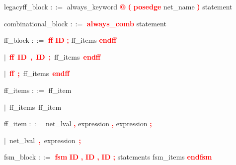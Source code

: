 \vspace{1em}
\noindent
\settowidth{\parindent}{\hspace{4ex}}
legacyff\_block $::=$\hspace{1ex} always\_keyword \textbf{\textcolor{red}{@}} \textbf{\textcolor{red}{(}} \textbf{\textcolor{red}{posedge}} net\_name \textbf{\textcolor{red}{)}} statement

\vspace{1em}
\noindent
\settowidth{\parindent}{\hspace{4ex}}
combinational\_block $::=$\hspace{1ex} \textbf{\textcolor{red}{always\_comb}} statement

\vspace{1em}
\noindent
\settowidth{\parindent}{\hspace{4ex}}
ff\_block $::=$\hspace{1ex} \textbf{\textcolor{red}{ff}} \textbf{\textcolor{red}{ID}} \textbf{\textcolor{red}{;}} ff\_items \textbf{\textcolor{red}{endff}}

\mbox{$|$ \textbf{\textcolor{red}{ff}} \textbf{\textcolor{red}{ID}} \textbf{\textcolor{red}{,}} \textbf{\textcolor{red}{ID}} \textbf{\textcolor{red}{;}} ff\_items \textbf{\textcolor{red}{endff}}}

\mbox{$|$ \textbf{\textcolor{red}{ff}} \textbf{\textcolor{red}{;}} ff\_items \textbf{\textcolor{red}{endff}}}

\vspace{1em}
\noindent
\settowidth{\parindent}{\hspace{4ex}}
ff\_items $::=$\hspace{1ex} ff\_item

\mbox{$|$ ff\_items ff\_item}

\vspace{1em}
\noindent
\settowidth{\parindent}{\hspace{4ex}}
ff\_item $::=$\hspace{1ex} net\_lval \textbf{\textcolor{red}{,}} expression \textbf{\textcolor{red}{,}} expression \textbf{\textcolor{red}{;}}

\mbox{$|$ net\_lval \textbf{\textcolor{red}{,}} expression \textbf{\textcolor{red}{;}}}

\vspace{1em}
\noindent
\settowidth{\parindent}{\hspace{4ex}}
fsm\_block $::=$\hspace{1ex} \textbf{\textcolor{red}{fsm}} \textbf{\textcolor{red}{ID}} \textbf{\textcolor{red}{,}} \textbf{\textcolor{red}{ID}} \textbf{\textcolor{red}{,}} \textbf{\textcolor{red}{ID}} \textbf{\textcolor{red}{;}} statements fsm\_items \textbf{\textcolor{red}{endfsm}}

